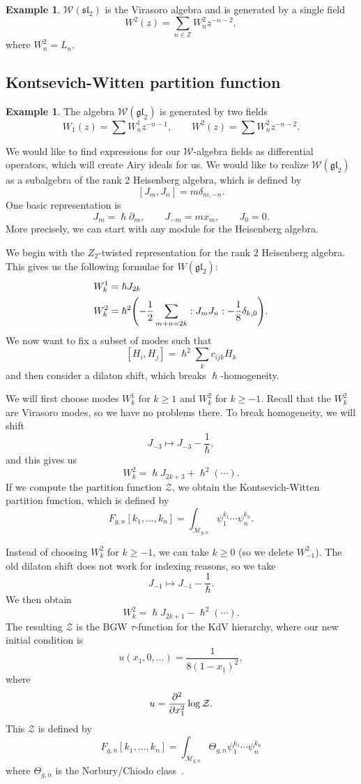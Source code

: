\documentclass{amsart}
\theoremstyle{definition}
\newtheorem{exm}[thm]{Example}
\theoremstyle{remark}
\theoremstyle{plain}
\theoremstyle{definition}
\theoremstyle{remark}
\newcommand{\Z}{\mathbb{Z}}
\newcommand{\mc}[1]{\mathcal{#1}}
\newcommand{\mf}[1]{\mathfrak{#1}}
\newcommand{\ol}[1]{\overline{#1}}
\newcommand{\1}{\mathbf{1}}
\newcommand{\2}{\mathbf{2}}
\newcommand{\3}{\mathbf{3}}
\begin{document}
\begin{exm}
    $\mc{W}(\mf{sl}_2)$ is the Virasoro algebra and is generated by a single field 
    \[ W^2(z) = \sum_{n \in \Z} W_n^2 z^{-n-2}, \]
    where $W_n^2 = L_n$.
\end{exm}

\subsection{Kontsevich-Witten partition function}

\begin{exm}
    The algebra $\mc{W}(\mf{gl}_2)$ is generated by two fields
    \[ W_1(z) = \sum W_n^1 z^{-n-1}, \qquad W^2(z) = \sum W_n^2 z^{-n-2}. \]
\end{exm}

We would like to find expressions for our $\mc{W}$-algebra fields as differential operators, which will create Airy ideals for us. We would like to realize $\mc{W}(\mf{gl}_2)$ as a subalgebra of the rank 2 Heisenberg algebra, which is defined by
\[ [J_m, J_n] = m \delta_{m,-n}. \]
One basic representation is
\[ J_m = \hslash \partial_m, \qquad J_{-m} = m x_m, \qquad J_0 = 0. \]
More precisely, we can start with any module for the Heisenberg algebra.

We begin with the $Z_2$-twisted representation for the rank $2$ Heisenberg algebra. This gives us the following formulae for $W(\mf{gl}_2)$:
\begin{align*}
    W_k^1 &= \hslash J_{2k} \\
    W_k^2 &= \hslash^2 \qty(-\frac{1}{2} \sum_{m+n=2k} :J_m J_n: - \frac{1}{8} \delta_{k,0}).
\end{align*}
We now want to fix a subset of modes such that
\[ [H_i, H_j] = \hslash^2 \sum_k c_{ijk} H_k \]
and then consider a dilaton shift, which breaks $\hslash$-homogeneity.

We will first choose modes $W_k^1$ for $k \geq 1$ and $W_k^2$ for $k \geq -1$. Recall that the $W_k^2$ are Virasoro modes, so we have no problems there. To break homogeneity, we will shift
\[ J_{-3} \mapsto J_{-3} - \frac{1}{\hslash}, \]
and this gives us
\[ W_k^2 = \hslash J_{2k+3} + \hslash^2(\cdots). \]
If we compute the partition function $\mc{Z}$, we obtain the Kontsevich-Witten partition function, which is defined by
\[ F_{g,n}[k_1, \ldots, k_n] = \int_{\ol{\mc{M}}_{g, n}} \psi_1^{k_1} \cdots \psi_n^{k_n}. \]

Instead of choosing $W_k^2$ for $k \geq -1$, we can take $k \geq 0$ (so we delete $W_{-1}^2$). The old dilaton shift does not work for indexing reasons, so we take
\[ J_{-1} \mapsto J_{-1} - \frac{1}{\hslash}. \]
We then obtain
\[ W_k^2 = \hslash J_{2k+1} - \hslash^2(\cdots). \]
The resulting $\mc{Z}$ is the BGW $\tau$-function for the KdV hierarchy, where our new initial condition is
\[ u(x_1, 0, \ldots) = \frac{1}{8(1-x_1)^2}, \]
where
\[ u = \pdv[2]{x_1} \log \mc{Z}. \]
This $\mc{Z}$ is defined by
\[ F_{g, n}[k_1, \ldots, k_n] = \int_{\ol{\mc{M}}_{g, n}} \Theta_{g,n} \psi_1^{k_1} \cdots \psi_n^{k_n} \]
where $\Theta_{g,n}$ is the Norbury/Chiodo class~\cite{northetaclass}.
\end{document}
